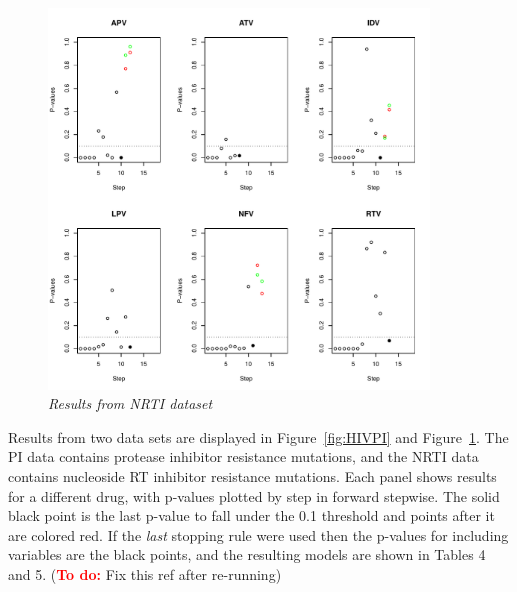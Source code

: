 \documentclass{imsart}
\newcommand{\todo}{\textcolor{red}{\textbf{To do: }}}
\begin{document}
\begin{figure}
\begin{center}
\includegraphics[width=0.9\textwidth]{../figs/HIV_NRTI.pdf}
\caption{\small \it Results from NRTI dataset}
\label{fig:HIVNRTI}
\end{center}
\end{figure}

Results from two data sets are displayed in Figure~\ref{fig:HIVPI} and
Figure~\ref{fig:HIVNRTI}. The PI data contains protease inhibitor
resistance mutations, and the NRTI data contains nucleoside RT inhibitor
resistance mutations.
Each panel shows results for a different drug,
with p-values plotted by step in forward stepwise. The solid black point
is the last p-value to fall under the 0.1 threshold and points after it
are colored red. If the \textit{last} stopping rule were used then the
p-values for including variables are the black points, and the resulting
models are shown in Tables 4 and 5. (\todo Fix this ref after re-running)




\end{document}
